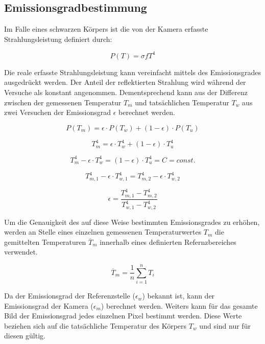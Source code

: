 \documentclass{article}
\begin{document}
\subsection{Emissionsgradbestimmung}
Im Falle eines schwarzen Körpers ist die von der Kamera erfasste Strahlungsleistung definiert durch:

\begin{equation}
    P(T) = \sigma f T^4
\end{equation}

Die reale erfasste Strahlungsleistung kann vereinfacht mittels des Emissionsgrades ausgedrückt werden. 
Der Anteil der reflektierten Strahlung wird während der Versuche als konstant angenommen.
Dementsprechend kann aus der Differenz zwischen der gemessenen Temperatur $T_m$ und tatsächlichen Temperatur $T_w$ aus zwei Versuchen der Emissionsgrad $\epsilon$ berechnet werden.

\begin{equation}
    P(T_m) = \epsilon \cdot P(T_w) + (1 - \epsilon) \cdot P(T_u)
\end{equation}
 
\begin{equation}
   T_m^4 = \epsilon \cdot T_w^4 + (1 - \epsilon) \cdot T_u^4
\end{equation}

\begin{equation}
    T_m^4 - \epsilon \cdot T_w^4 = (1 - \epsilon) \cdot T_u^4 = C = \textit{const.}
\end{equation}

\begin{equation}
    T_{m,1}^4 - \epsilon \cdot T_{w,1}^4 = T_{m,2}^4 - \epsilon \cdot T_{w,2}^4 
\end{equation}

\begin{equation}
    \epsilon = \frac{T_{m,1}^4 - T_{m,2}^4}{T_{w,1}^4 - T_{w,2}^4}
\end{equation}

Um die Genauigkeit des auf diese Weise bestimmten Emissionsgrades zu erhöhen, werden an Stelle eines einzelnen gemessenen Temperaturwertes $T_m$ die gemittelten Temperaturen $\overline T_m$ innerhalb eines definierten Refernzbereiches verwendet.

\begin{equation}
    \overline T_m = \frac{1}{n} \sum_{i=1}^n T_i
\end{equation}

Da der Emissionsgrad der Referenzstelle ($\epsilon_{w}$) bekannt ist, kann der Emissionsgrad der Kamera ($\epsilon_{m}$) berechnet werden.
Weiters kann für das gesamte Bild der Emissionsgrad jedes einzelnen Pixel bestimmt werden.
Diese Werte beziehen sich auf die tatsächliche Temperatur des Körpers $T_w$ und sind nur für diesen gültig.
\end{document}
